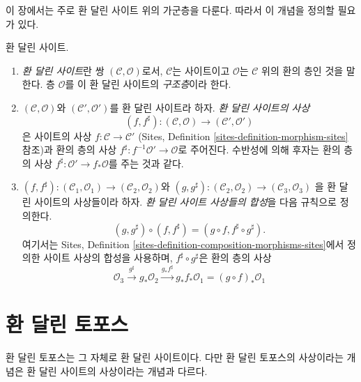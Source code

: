 \noindent
이 장에서는 주로 환 달린 사이트 위의 가군층을 다룬다. 따라서 이 개념을
정의할 필요가 있다.

\begin{definition}
\label{definition-ringed-site}
환 달린 사이트.
\begin{enumerate}
\item {\it 환 달린 사이트}란 쌍 $(\mathcal{C}, \mathcal{O})$로서,
$\mathcal{C}$는 사이트이고 $\mathcal{O}$는 $\mathcal{C}$ 위의 환의 층인
것을 말한다. 층 $\mathcal{O}$를 이 환 달린 사이트의 {\it 구조층}이라 한다.
\item $(\mathcal{C}, \mathcal{O})$와 $(\mathcal{C}', \mathcal{O}')$를
환 달린 사이트라 하자. {\it 환 달린 사이트의 사상}
$$
(f, f^\sharp) :
(\mathcal{C}, \mathcal{O})
\longrightarrow
(\mathcal{C}', \mathcal{O}')
$$
은 사이트의 사상 $f : \mathcal{C} \to \mathcal{C}'$
(Sites, Definition \ref{sites-definition-morphism-sites} 참조)과 환의 층의 사상
$f^\sharp : f^{-1}\mathcal{O}' \to \mathcal{O}$로 주어진다. 수반성에 의해
후자는 환의 층의 사상 $f^\sharp : \mathcal{O}' \to f_*\mathcal{O}$를
주는 것과 같다.
\item
$(f, f^\sharp) :
(\mathcal{C}_1, \mathcal{O}_1) \to (\mathcal{C}_2, \mathcal{O}_2)$와
$(g, g^\sharp) :
(\mathcal{C}_2, \mathcal{O}_2) \to (\mathcal{C}_3, \mathcal{O}_3)$
을 환 달린 사이트의 사상들이라 하자. {\it 환 달린 사이트 사상들의 합성}을
다음 규칙으로 정의한다.
$$
(g, g^\sharp) \circ (f, f^\sharp) = (g \circ f, f^\sharp \circ g^\sharp).
$$
여기서는 Sites, Definition
\ref{sites-definition-composition-morphisms-sites}에서 정의한 사이트 사상의
합성을 사용하며, $f^\sharp \circ g^\sharp$은 환의 층의 사상
$$
\mathcal{O}_3 \xrightarrow{g^\sharp} g_*\mathcal{O}_2
\xrightarrow{g_*f^\sharp} g_*f_*\mathcal{O}_1 = (g \circ f)_*\mathcal{O}_1
$$
\end{enumerate}
\end{definition}






\section{환 달린 토포스}
\label{section-ringed-topoi}

\noindent
환 달린 토포스는 그 자체로 환 달린 사이트이다. 다만 환 달린 토포스의
사상이라는 개념은 환 달린 사이트의 사상이라는 개념과 다르다.

